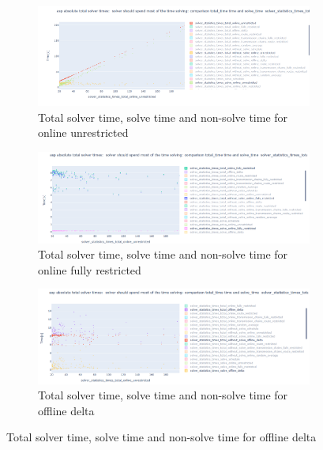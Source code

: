 \documentclass{article}
\begin{document}
\begin{figure}[hbtp]
    \begin{subfigure}{\textwidth}
        \includegraphics[width=\textwidth]{Figures/04_computational_results/solve_non_solve_online_unrestricted.PNG}
        \caption{Total solver time, solve time and non-solve time for online unrestricted}
         \label{fig:computationtimes_solve_non_solve_time_online_unrestricted}
    \end{subfigure}
    \begin{subfigure}{\textwidth}
        \includegraphics[width=\textwidth]{Figures/04_computational_results/solve_non_solve_online_fully_restricted.PNG}
        \caption{Total solver time, solve time and non-solve time for online fully restricted}
         \label{fig:computationtimes_solve_non_solve_time_online_fully_restricted}
    \end{subfigure}
    \begin{subfigure}{\textwidth}
        \includegraphics[width=\textwidth]{Figures/04_computational_results/solve_non_solve_online_delta.PNG}
        \caption{Total solver time, solve time and non-solve time for offline delta}

\end{subfigure}
\end{figure}
\end{document}
